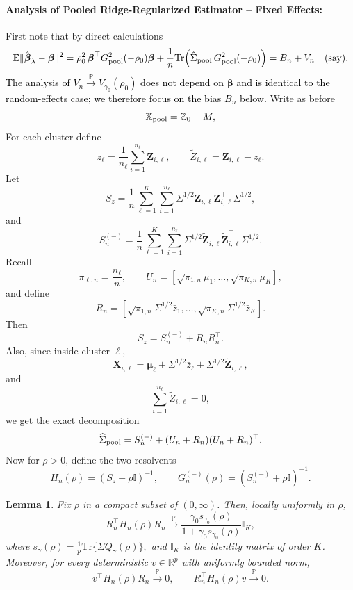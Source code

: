 \documentclass{article}
\theoremstyle{plain}
\newtheorem{lemma}[theorem]{Lemma}
\theoremstyle{remark}
\def \bbeta{\boldsymbol{\beta}}
\def \bZ{\mathbf{Z}}
\def \bbeta{\boldsymbol{\beta}}
\def \Xm {\mathbb{X}_{\rm pool}}
\def \tr {\mathrm{Tr}}
\def \bX{\mathbf{X}}
\def \I{\mathcal{I}}
\def \E{\mathbb{E}}
\def \P{\mathbb{P}}
\def \bmu{\pmb{\mu}}
\def \bZ {{\boldsymbol{Z}}}
\def \bX{\boldsymbol{X}}
\def \I {\mathbb{I}}
\begin{document}
\paragraph{Analysis of Pooled Ridge-Regularized Estimator -- Fixed Effects:} First note that by direct calculations
\begin{align*}
    \E\|\hat{\bbeta}_{\lambda}-\bbeta\|^2=\rho_0^2\,\bbeta^\top \textcolor{black}{G_{\rm pool}^2(-\rho_0)}\bbeta+\frac{1}{n}\tr\!\left(\hat{\Sigma}_{\rm pool}\,\textcolor{black}{G_{\rm pool}^2(-\rho_0)}\right)=B_n+V_n \quad (\text{say}).
\end{align*}
\textcolor{black}{The analysis of $V_n\stackrel{\P}{\to}V_{\gamma_0}(\rho_0)$ does not depend on $\bbeta$ and is identical to the random-effects case; we therefore focus on the bias $B_n$ below.}
Write as before
\[
\Xm=\mathbb{Z}_0+M,
\]
For each cluster define
\[
\bar z_\ell
=
\frac1{n_\ell}\sum_{i=1}^{n_\ell}\bZ_{i,\ell},
\qquad
\widetilde Z_{i,\ell}
=
\bZ_{i,\ell}-\bar z_\ell.
\]
Let
\[
S_z
=
\frac1n
\sum_{\ell=1}^K
\sum_{i=1}^{n_\ell}
\Sigma^{1/2}\bZ_{i,\ell}\bZ_{i,\ell}^\top\Sigma^{1/2},
\]
and
\[
S_n^{(-)}
=
\frac1n
\sum_{\ell=1}^K
\sum_{i=1}^{n_\ell}
\Sigma^{1/2}
\widetilde \bZ_{i,\ell}
\widetilde \bZ_{i,\ell}^{\top}
\Sigma^{1/2}.
\]
Recall
\[
\pi_{\ell,n}=\frac{n_\ell}{n},
\qquad
U_n=
[
\sqrt{\pi_{1,n}}\mu_1,\ldots,\sqrt{\pi_{K,n}}\mu_K
],
\]
and define
\[
R_n=
[
\sqrt{\pi_{1,n}}\Sigma^{1/2}\bar z_1,\ldots,
\sqrt{\pi_{K,n}}\Sigma^{1/2}\bar z_K
].
\]
Then
\[
S_z
=
S_n^{(-)}+R_nR_n^\top.
\]
Also, since inside cluster \(\ell\),
\[
\bX_{i,\ell}
=
\bmu_\ell+\Sigma^{1/2}\bar z_\ell
+
\Sigma^{1/2}\widetilde \bZ_{i,\ell},
\]
and
\[
\sum_{i=1}^{n_\ell}\widetilde Z_{i,\ell}=0,
\]
we get the exact decomposition
\[
\widehat\Sigma_{\rm pool}
=
S_n^{(-)}+(U_n+R_n)(U_n+R_n)^\top.
\]
Now for \(\rho>0\), define the two resolvents
\[
H_n(\rho)
=
(S_z+\rho \I)^{-1},
\qquad
G_n^{(-)}(\rho)
=
(S_n^{(-)}+\rho \I)^{-1}.
\]
\begin{lemma}\label{lemma:hn}
    Fix \(\rho\) in a compact subset of \((0,\infty)\). Then, locally uniformly in \(\rho\),
\[
R_n^\top H_n(\rho)R_n
\overset{\P}{\longrightarrow}
\frac{\gamma_0s_{\gamma_0}(\rho)}
{1+\gamma_0s_{\gamma_0}(\rho)}
\I_K,
\]
where $s_\gamma(\rho)
    =
    \frac1p\tr\{\Sigma Q_\gamma(\rho)\},$ and $\I_K$ is the identity matrix of order $K$.
Moreover, for every deterministic \(v\in\mathbb R^p\) with uniformly bounded norm,
\[
v^\top H_n(\rho)R_n
\overset{\P}{\longrightarrow}0,
\qquad
R_n^\top H_n(\rho)v
\overset{\P}{\longrightarrow}0.
\]

\end{lemma}
\end{document}

